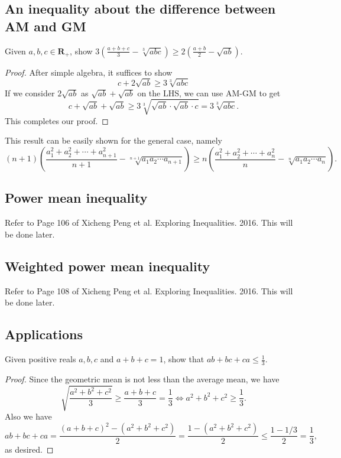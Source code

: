 \documentclass{article}
\theoremstyle{remark}
\def\R{\mathbf{R}}
\begin{document}
\subsection{An inequality about the difference between AM and GM}
Given $a,b,c\in\R_+$, show $3(\frac{a+b+c}{3}-\sqrt[3]{abc})\ge 2(\frac{a+b}{2}-\sqrt{ab})$.
\begin{proof}
After simple algebra, it suffices to show
\[
c+2\sqrt{ab}\ge 3\sqrt[3]{abc}
\]
If we consider $2\sqrt{ab}$ as $\sqrt{ab}+\sqrt{ab}$ on the LHS, we can use AM-GM to get
\[
c+\sqrt{ab}+\sqrt{ab}\ge 3\sqrt[3]{\sqrt{ab}\cdot\sqrt{ab}\cdot c}=3\sqrt[3]{abc}.
\]
This completes our proof.
\end{proof}

This result can be easily shown for the general case, namely
\[
(n+1)(\frac{a_1^2+a_2^2+\cdots+a_{n+1}^2}{n+1}-\sqrt[n+1]{a_1a_2\cdots a_{n+1}})\ge
n(\frac{a_1^2+a_2^2+\cdots+a_n^2}{n}-\sqrt[n]{a_1a_2\cdots a_n}).
\]
\subsection{Power mean inequality}
Refer to Page 106 of Xicheng Peng et al. Exploring Inequalities. 2016. This will be done later.

\subsection{Weighted power mean inequality}
Refer to Page 108 of Xicheng Peng et al. Exploring Inequalities. 2016. This will be done later.

\subsection{Applications}
Given positive reals $a,b,c$ and $a+b+c=1$, show that $ab+bc+ca\le \frac{1}{3}$.
\begin{proof}
Since the geometric mean is not less than the average mean, we have
\[
\sqrt{\frac{a^2+b^2+c^2}{3}}\ge \frac{a+b+c}{3}=\frac{1}{3} \Longleftrightarrow a^2+b^2+c^2\ge \frac{1}{3}.
\]
Also we have
\[
ab+bc+ca=\frac{(a+b+c)^2-(a^2+b^2+c^2)}{2}=\frac{1-(a^2+b^2+c^2)}{2}\le \frac{1-1/3}{2}=\frac{1}{3},
\]
as desired.
\end{proof}
\end{document}
